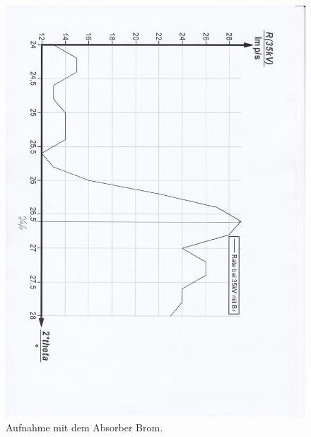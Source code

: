 \begin{figure}[p]
  \centering
  \includegraphics[width=\textwidth]{content/Brom.jpg}
  \caption{Aufnahme mit dem Absorber Brom.}
  \label{Bild:3}
\end{figure}
